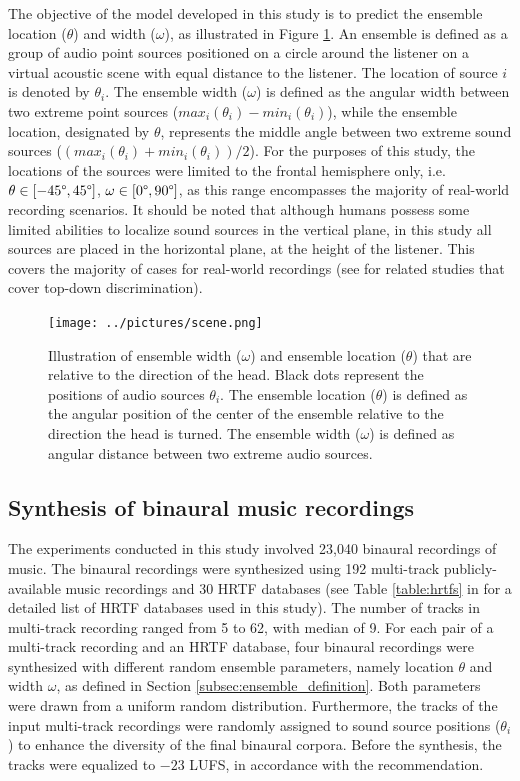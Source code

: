 \documentclass{article}
\begin{document}
The objective of the model developed in this study is to predict the ensemble location ($\theta$) and width ($\omega$), as illustrated in Figure \ref{fig:scene}. An ensemble is defined as a group of audio point sources positioned on a circle around the listener on a virtual acoustic scene with equal distance to the listener. The location of source $i$ is denoted by $\theta_i$. The ensemble width ($\omega$) is defined as the angular width between two extreme point sources ($max_i(\theta_i)-min_i(\theta_i)$), while the ensemble location, designated by $\theta$, represents the middle angle between two extreme sound sources ($(max_i(\theta_i)+min_i(\theta_i))/2$). For the purposes of this study, the locations of the sources were limited to the frontal hemisphere only, i.e. $\theta\in[-45\degree, 45\degree]$, $\omega\in[0\degree, 90\degree]$, as this range encompasses the majority of real-world recording scenarios. It should be noted that although humans possess some limited abilities to localize sound sources in the vertical plane, in this study all sources are placed in the horizontal plane, at the height of the listener. This covers the majority of cases for real-world recordings (see \cite{ma_robust_2018, zielinski_spatial_2022} for related studies that cover top-down discrimination).

\begin{figure}[ht]
  \centering
  \texttt{[image: ../pictures/scene.png]}
  \caption{\label{fig:scene}Illustration of ensemble width ($\omega$) and ensemble location ($\theta$) that are relative to the direction of the head. Black dots represent the positions of audio sources $\theta_i$. The ensemble location ($\theta$) is defined as the angular position of the center of the ensemble relative to the direction the head is turned. The ensemble width ($\omega$) is defined as angular distance between two extreme audio sources. }
\end{figure}

\subsection{Synthesis of binaural music recordings}
\label{subsec:synthesis}

The experiments conducted in this study involved 23,040 binaural recordings of music. The binaural recordings were synthesized using 192 multi-track publicly-available music recordings \parencite{senior_mixing_2023} and 30 HRTF databases (see Table \ref{table:hrtfs} in  for a detailed list of HRTF databases used in this study). The number of tracks in multi-track recording ranged from 5 to 62, with median of 9. For each pair of a multi-track recording and an HRTF database, four binaural recordings were synthesized with different random ensemble parameters, namely location $\theta$ and width $\omega$, as defined in Section \ref{subsec:ensemble_definition}. Both parameters were drawn from a uniform random distribution. Furthermore, the tracks of the input multi-track recordings were randomly assigned to sound source positions ($\theta_i$) to enhance the diversity of the final binaural corpora. Before the synthesis, the tracks were equalized to $-23$ LUFS, in accordance with the \parencite{noauthor_itu-r_2023} recommendation.
\end{document}
